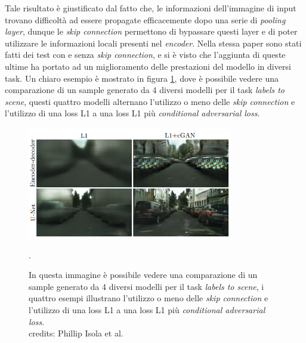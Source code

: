 Tale risultato è giustificato dal fatto che, le informazioni dell'immagine di input trovano difficoltà ad essere propagate efficacemente dopo una serie di
\textit{pooling layer}, dunque le \textit{skip connection} permettono di bypassare questi layer e di poter utilizzare le informazioni locali presenti 
nel \textit{encoder}. 
Nella stessa paper sono stati fatti dei test con e senza \textit{skip connection}, e si è visto che l'aggiunta di queste ultime ha portato ad un 
miglioramento delle prestazioni del modello in diversi task. Un chiaro esempio è mostrato in figura \ref{fig:unet_comparison}, 
dove è possibile vedere una comparazione di un sample generato da 4 diversi modelli per il task \textit{labels to scene},
questi quattro modelli alternano l'utilizzo o meno delle \textit{skip connection} e l'utilizzo di una loss L1 a una loss L1 più \textit{conditional adversarial loss}.
    \begin{figure}[H]
        \centering
        \includegraphics[width=0.8\textwidth]{imgs/unet_comparison.png}
        \caption{In questa immagine è possibile vedere una comparazione di un sample generato da 4 diversi modelli per il task \textit{labels to scene},
            i quattro esempi illustrano l'utilizzo o meno delle \textit{skip connection} e l'utilizzo di una loss L1 a una loss L1 più \textit{conditional adversarial loss}.\\
            credits: Phillip Isola et al. \cite{isola2018imagetoimage}}.
        \label{fig:unet_comparison}
    \end{figure}


